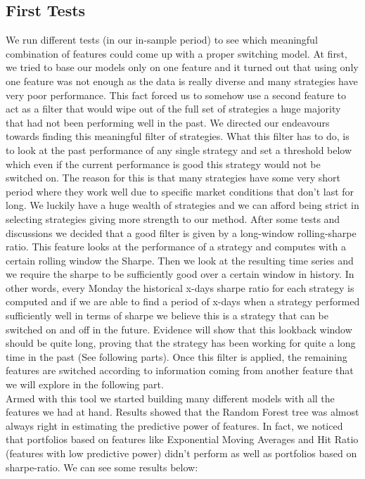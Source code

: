 \documentclass[a4paper]{article}
\numberwithin{equation}{subsection}
\begin{document}
\subsection*{First Tests}

We run different tests (in our in-sample period) to see which meaningful combination of features could come up with a proper switching model. At first, we tried to base our models only on one feature and it turned out that using only one feature was not enough as the data is really diverse and many strategies have very poor performance. This fact forced us to somehow use a second feature to act as a filter that would wipe out of the full set of strategies a huge majority that had not been performing well in the past. We directed our endeavours towards finding this meaningful filter of strategies. What this filter has to do, is to look at the past performance of any single strategy and set a threshold below which even if the current performance is good this strategy would not be switched on. The reason for this is that many strategies have some very short period where they work well due to specific market conditions that don't last for long. We luckily have a huge wealth of strategies and we can afford being strict in selecting strategies giving more strength to our method. After some tests and discussions we decided that a good filter is given by a long-window rolling-sharpe ratio. This feature looks at the performance of a strategy and computes with a certain rolling window the Sharpe. Then we look at the resulting time series and we require the sharpe to be sufficiently good over a certain window in history. In other words, every Monday the historical x-days sharpe ratio for each strategy is computed and if we are able to find  a period of x-days when a strategy performed sufficiently well in terms of sharpe we believe this is a strategy that can be switched on and off in the future. Evidence will show that this lookback window should be quite long, proving that the strategy has been working for quite a long time in the past (See following parts). Once this filter is applied, the remaining features are switched according to information coming from another feature that we will explore in the following part.\\
Armed with this tool we started building many different models with all the features we had at hand. Results showed that the Random Forest tree was almost always right in estimating the predictive power of features. In fact, we noticed that portfolios based on features like Exponential Moving Averages and Hit Ratio (features with low predictive power) didn't perform as well as portfolios based on sharpe-ratio. We can see some results below:
\end{document}
